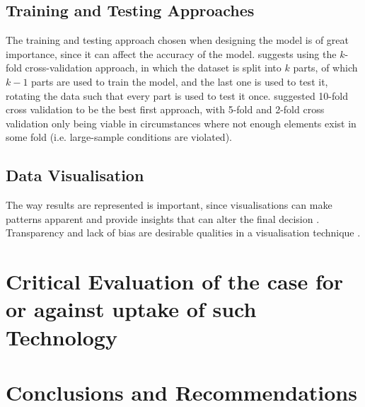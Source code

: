\documentclass[a4paper,12pt]{article}
\begin{document}
\subsection{Training and Testing Approaches}

The training and testing approach chosen when designing the model is of great importance, since it can affect the accuracy of the model.
\textcite[39]{Consoli2019} suggests using the \(k\)-fold cross-validation approach, in which the dataset is split into \(k\) parts, of which \(k-1\) parts are used to train the model, and the last one is used to test it, rotating the data such that every part is used to test it once. \textcite{Wong2020} suggested 10-fold cross validation to be the best first approach, with 5-fold and 2-fold cross validation only being viable in circumstances where not enough elements exist in some fold (i.e. large-sample conditions are violated).

\subsection{Data Visualisation}

The way results are represented is important, since visualisations can make patterns apparent and provide insights that can alter the final decision \parencite{Hendriks2019}.
Transparency and lack of bias are desirable qualities in a visualisation technique \parencite{Hendriks2019}.

\section{Critical Evaluation of the case for or against uptake of such Technology}



\section{Conclusions and Recommendations}
\pagebreak
\printbibliography
\end{document}
